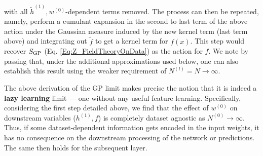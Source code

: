 with all $\tilde{h}^{(1)},w^{(0)}$-dependent terms removed. The process can then be repeated, namely, perform a cumulant expansion in the second to last term of the above action under the Gaussian measure induced by the new kernel term (last term above) and integrating out $\tilde{f}$ to get a kernel term for $f(x)$. This step would recover $S_{\text{GP}}$ (Eq. \ref{Eq:Z_FieldTheoryOnData}) as the action for $f$. We note by passing that, under the additional approximations used below, one can also establish this result using the weaker requirement of $N^{(l)}=N \rightarrow \infty$. 

The above derivation of the GP limit makes precise the notion that it is indeed a {\bf lazy learning} \citep{chizat2018lazy} limit --- one without any useful feature learning. Specifically, considering the first step detailed above, we find that the effect of $w^{(0)}$ on downstream variables ($h^{(1)},f$) is completely dataset agnostic as $N^{(0)}\rightarrow \infty$. Thus, if some dataset-dependent information gets encoded in the input weights, it has no consequence on the downstream processing of the network or predictions. The same then holds for the subsequent layer.   

